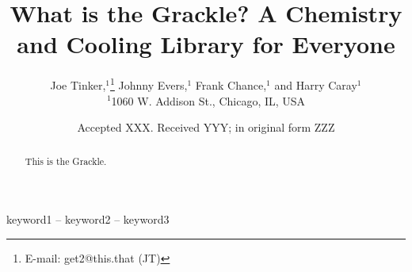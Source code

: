 \documentclass[a4paper,fleqn,usenatbib]{mnras}
\title[The Grackle]{What is the Grackle?  A Chemistry and Cooling
  Library for Everyone}
\author[J. Tinker et al.]{
Joe Tinker,$^{1}$\thanks{E-mail: get2@this.that (JT)}
Johnny Evers,$^{1}$
Frank Chance,$^{1}$
and Harry Caray$^{1}$
\\
$^{1}$1060 W. Addison St., Chicago, IL, USA\\
}
\date{Accepted XXX. Received YYY; in original form ZZZ}
\begin{document}
\label{firstpage}
\pagerange{\pageref{firstpage}--\pageref{lastpage}}
\maketitle

\begin{abstract}
This is the Grackle.
\end{abstract}

\begin{keywords}
keyword1 -- keyword2 -- keyword3
\end{keywords}

















\footnotesize{
  
  
}

\bsp
\label{lastpage}
\end{document}
